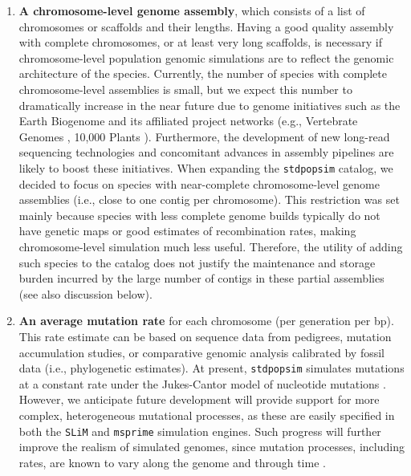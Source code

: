 \documentclass[hidelinks]{article}
\newcommand{\stdpopsim}{\texttt{stdpopsim}\xspace}
\begin{document}
\begin{enumerate}
\def\labelenumi{\arabic{enumi}.}

\item
  \textbf{A chromosome-level genome assembly}, which consists of a list of chromosomes or scaffolds and their lengths. 
  Having a good quality assembly with complete chromosomes, or at least very long scaffolds, 
  is necessary if chromosome-level population genomic simulations are to reflect the genomic architecture of the species.
  Currently, the number of species with complete chromosome-level assemblies is small,
  but we expect this number to dramatically increase in the near future due to genome initiatives 
  such as the Earth Biogenome \citep{Lewin2022} and its affiliated project networks (e.g.,
  Vertebrate Genomes \citep{Rhie2021}, 10,000 Plants \citep{Cheng2018}).
  Furthermore, the development of new long-read sequencing technologies
  \citep{Amarasinghe2020,Amarasinghe2021} and concomitant advances in assembly pipelines
  \citep{Chakraborty2016} are likely to boost these initiatives. 
  When expanding the \stdpopsim catalog, we decided to focus on species with near-complete 
  chromosome-level genome assemblies (i.e., close to one contig per chromosome).
  This restriction was set mainly because species with less complete genome builds 
  typically do not have genetic maps or good estimates of recombination rates, 
  making chromosome-level simulation much less useful. 
  Therefore, the utility of adding such species to the catalog does not justify the 
  maintenance and storage burden incurred by the large number of contigs in these partial assemblies (see also discussion below).

\item
  \textbf{An average mutation rate} for each chromosome (per generation per bp).
  This rate estimate can be based on sequence data from pedigrees, mutation accumulation studies, 
  or comparative genomic analysis calibrated by fossil data (i.e., phylogenetic estimates).
  At present, \stdpopsim simulates mutations at a constant rate under the Jukes-Cantor model of nucleotide mutations \citep{Jukes1969}.
  However, we anticipate future development will provide support for more complex, heterogeneous mutational processes,
  as these are easily specified in both the \texttt{SLiM} and \texttt{msprime} simulation engines.
  Such progress will further improve the realism of simulated genomes,
  since mutation processes, including rates, are known to vary along the genome and through time \citep{Benzer1961,Ellegren2003,Supek2019}.


\end{enumerate}
\end{document}
